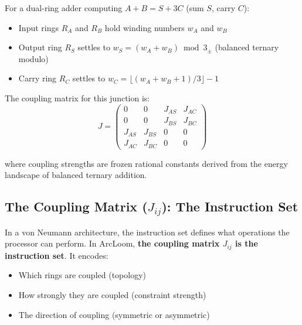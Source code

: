 \documentclass[11pt, a4paper]{article}
\begin{document}
For a dual-ring adder computing $A + B = S + 3C$ (sum $S$, carry $C$):
\begin{itemize}[nosep]
  \item Input rings $R_A$ and $R_B$ hold winding numbers $w_A$ and $w_B$
  \item Output ring $R_S$ settles to $w_S = (w_A + w_B) \bmod 3_{\pm}$
        (balanced ternary modulo)
  \item Carry ring $R_C$ settles to $w_C = \lfloor(w_A + w_B + 1)/3\rfloor - 1$
\end{itemize}

The coupling matrix for this junction is:
\begin{equation}
  J = \begin{pmatrix}
    0 & 0 & J_{AS} & J_{AC} \\
    0 & 0 & J_{BS} & J_{BC} \\
    J_{AS} & J_{BS} & 0 & 0 \\
    J_{AC} & J_{BC} & 0 & 0
  \end{pmatrix}
\end{equation}

where coupling strengths are frozen rational constants derived from the
energy landscape of balanced ternary addition.

\subsection{The Coupling Matrix ($J_{ij}$): The Instruction Set}

In a von Neumann architecture, the instruction set defines what operations
the processor can perform. In ArcLoom, \textbf{the coupling matrix $J_{ij}$
is the instruction set}. It encodes:
\begin{itemize}[nosep]
  \item Which rings are coupled (topology)
  \item How strongly they are coupled (constraint strength)
  \item The direction of coupling (symmetric or asymmetric)
\end{itemize}
\end{document}
